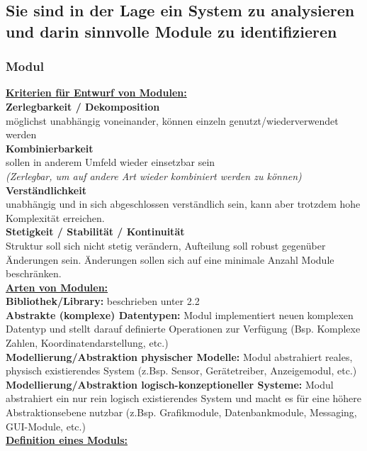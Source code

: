 \documentclass[a4paper]{article}
\begin{document}
	\newpage
	\subsection{Sie sind in der Lage ein System zu analysieren und darin sinnvolle Module zu identifizieren}
	\subsubsection{Modul}
	\textbf{\underline{Kriterien für Entwurf von Modulen:}}\\
	\textbf{Zerlegbarkeit / Dekomposition}\\
	möglichst unabhängig voneinander, können einzeln genutzt/wiederverwendet werden\\
	\textbf{Kombinierbarkeit}\\
	sollen in anderem Umfeld wieder einsetzbar sein \\
	\textit{(Zerlegbar, um auf andere Art wieder kombiniert werden zu können)}\\
	\textbf{Verständlichkeit}\\
	unabhängig und in sich abgeschlossen verständlich sein, kann aber trotzdem hohe Komplexität erreichen.\\
	\textbf{Stetigkeit / Stabilität / Kontinuität}\\
	Struktur soll sich nicht stetig verändern, Aufteilung soll robust gegenüber Änderungen sein. Änderungen sollen sich auf eine minimale Anzahl Module beschränken.\\
	\newline
	\textbf{\underline{Arten von Modulen:}}\\
	\textbf{Bibliothek/Library:} beschrieben unter 2.2\\
	\textbf{Abstrakte (komplexe) Datentypen:} Modul implementiert neuen komplexen Datentyp und stellt darauf definierte Operationen zur Verfügung (Bsp. Komplexe Zahlen, Koordinatendarstellung, etc.)\\
	\textbf{Modellierung/Abstraktion physischer Modelle:} Modul abstrahiert reales, physisch existierendes System (z.Bsp. Sensor, Gerätetreiber, Anzeigemodul, etc.)\\
	\textbf{Modellierung/Abstraktion logisch-konzeptioneller Systeme:} Modul abstrahiert ein nur rein logisch existierendes System und macht es für eine höhere Abstraktionsebene nutzbar (z.Bsp. Grafikmodule, Datenbankmodule, Messaging, GUI-Module, etc.)\\
	\newline
	\textbf{\underline{Definition eines Moduls:}}\\
\end{document}
